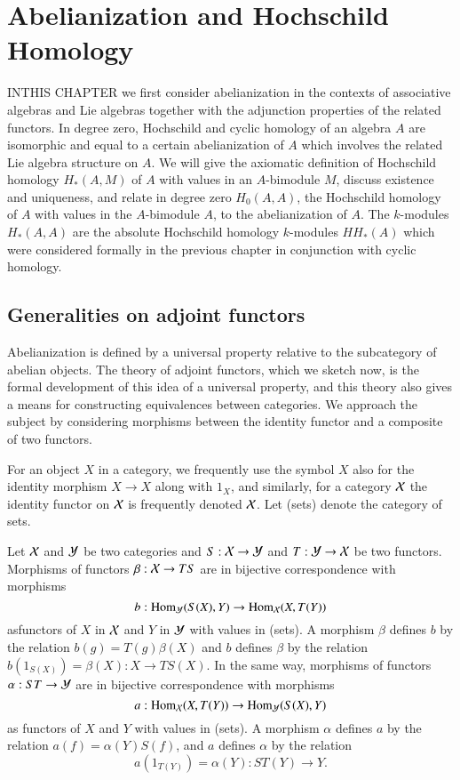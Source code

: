 \chapter{Abelianization and Hochschild Homology}\label{chap2}

IN\pageoriginale THIS CHAPTER we first consider abelianization in the
contexts of associative algebras and Lie algebras together with the
adjunction properties of the related functors. In degree zero,
Hochschild and cyclic homology of an algebra $A$ are isomorphic and
equal to a certain abelianization of $A$ which involves the related
Lie algebra structure on $A$. We will give the axiomatic definition of
Hochschild homology $H_{\ast}(A,M)$ of $A$ with values in an
$A$-bimodule $M$, discuss existence and uniqueness, and relate in
degree zero $H_{0}(A,A)$, the Hochschild homology of $A$ with values
in the $A$-bimodule $A$, to the abelianization of $A$. The $k$-modules
$H_{\ast}(A,A)$ are the absolute Hochschild homology $k$-modules
$HH_{\ast}(A)$ which were considered formally in the previous chapter
in conjunction with cyclic homology.

\section{Generalities on adjoint
  functors}\label{chap2-sec1}

Abelianization is defined by a universal property relative to the
subcategory of abelian objects. The theory of adjoint functors, which
we sketch now, is the formal development of this idea of a universal
property, and this theory also gives a means for constructing
equivalences between categories. We approach the subject by
considering morphisms between the identity functor and a composite of
two functors.

For an object $X$ in a category, we frequently use the symbol $X$ also
for the identity morphism $X\to X$ along with $1_{X}$, and similarly,
for a category $\mathcal{X}$ the identity functor on $\mathcal{X}$ is frequently
denoted $\mathcal{X}$. Let (sets) denote the category of sets.

\begin{remark}\label{chap2-rem1.1}
Let $\mathcal{X}$ and $\mathcal{Y}$ be two categories and $S:\mathcal{X}\to \mathcal{Y}$ and $T:\mathcal{Y}\to \mathcal{X}$
be two functors. Morphisms of functors $\beta:\mathcal{X}\to TS$ are in
bijective correspondence with morphisms
$$
b:\operatorname{Hom}_{\mathcal{Y}}(S(X),Y)\to \operatorname{Hom}_{\mathcal{X}}(X,T(Y))
$$
as\pageoriginale functors of $X$ in $\mathcal{X}$ and $Y$ in $\mathcal{Y}$ with values
in (sets). A morphism $\beta$ defines $b$ by the relation
$b(g)=T(g)\beta(X)$ and $b$ defines $\beta$ by the relation
$b(1_{S(X)})=\beta(X):X\to TS(X)$. In the same way, morphisms of
functors $\alpha:ST\to \mathcal{Y}$ are in bijective correspondence with
morphisms
$$
a:\operatorname{Hom}_{\mathcal{X}}(X,T(Y))\to \operatorname{Hom}_{\mathcal{Y}}(S(X),Y)
$$
as functors of $X$ and $Y$ with values in (sets). A morphism $\alpha$
defines $a$ by the relation $a(f)=\alpha(Y)S(f)$, and $a$ defines
$\alpha$ by the relation
$$
a(1_{T(Y)})=\alpha(Y):ST(Y)\to Y.
$$
\end{remark}

